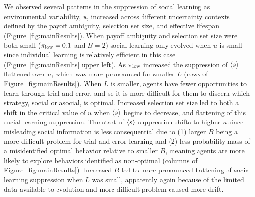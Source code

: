 \documentclass[letterpaper,11.5pt]{scrartcl}
\begin{document}
We observed several patterns in the suppression of social learning as environmental
variability, $u$, increased across different uncertainty contexts defined by the
payoff ambiguity, selection set size, and effective lifespan
(Figure~\ref{fig:mainResults}). When payoff ambiguity and selection set size
were both small ($\pi_{\mathrm{low}} = 0.1$ and $B=2$) social learning only evolved when
$u$ is small since individual learning is relatively efficient in this case
(Figure~\ref{fig:mainResults} upper left). As $\pi_{\mathrm{low}}$ increased the suppression of
$\langle s \rangle$ flattened over $u$, which was more pronounced for smaller $L$ (rows of
Figure~\ref{fig:mainResults}). 
When $L$ is smaller, agents have fewer opportunities to learn through trial and
error, and so it is more difficult for them to discern which strategy, social
or asocial, is optimal. Increased selection set size led to both a shift in 
the critical value of $u$ when $\langle s \rangle$ begins to decrease, and flattening of
this social learning suppression. The start of $\langle s \rangle$ suppression shifts
to higher $u$ since misleading social information is less consequential due to
(1) larger $B$ being a more difficult problem for trial-and-error learning and
(2) less probability mass of a misidentified optimal behavior relative to
smaller $B$, meaning agents are more likely to explore behaviors identified
as non-optimal (columns of Figure~\ref{fig:mainResults}). 
Increased $B$ led to more pronounced flattening of social learning
suppression when $L$ was small, apparently again because of the limited data
available to evolution and more difficult problem caused more drift.
\end{document}
